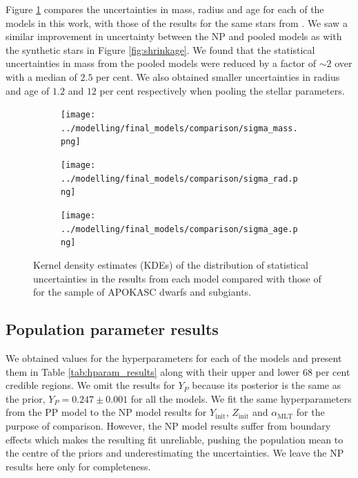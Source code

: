 \documentclass[a4paper,fleqn,usenatbib]{mnras}
\newcommand{\mlt}{\ensuremath{{\alpha_\mathrm{MLT}}}}
\begin{document}
Figure \ref{fig:unc-comp} compares the uncertainties in mass, radius and age for each of the models in this work, with those of the results for the same stars from . We saw a similar improvement in uncertainty between the NP and pooled models as with the synthetic stars in Figure \ref{fig:shrinkage}. We found that the statistical uncertainties in mass from the pooled models were reduced by a factor of $\sim 2$ over  with a median of $2.5$ per cent. We also obtained smaller uncertainties in radius and age of $1.2$ and $12$ per cent respectively when pooling the stellar parameters.

\begin{figure}
    \centering
    \begin{subfigure}[b]{.33\linewidth}
        \centering
        \texttt{[image: ../modelling/final\_models/comparison/sigma\_mass.png]}
    \end{subfigure}%
    \begin{subfigure}[b]{.33\linewidth}
        \centering
        \texttt{[image: ../modelling/final\_models/comparison/sigma\_rad.png]}
    \end{subfigure}%
    \begin{subfigure}[b]{.33\linewidth}
        \centering
        \texttt{[image: ../modelling/final\_models/comparison/sigma\_age.png]}
    \end{subfigure}%
    \caption{Kernel density estimates (KDEs) of the distribution of statistical uncertainties in the results from each model compared with those of  for the sample of APOKASC dwarfs and subgiants.}
    \label{fig:unc-comp}
\end{figure}

\subsection{Population parameter results}\label{sec:hparam-results}

We obtained values for the hyperparameters for each of the models and present them in Table \ref{tab:hparam_results} along with their upper and lower 68 per cent credible regions. We omit the results for $Y_P$ because its posterior is the same as the prior, $Y_P=0.247\pm0.001$ for all the models. We fit the same hyperparameters from the PP model to the NP model results for $Y_\mathrm{init}$, $Z_\mathrm{init}$ and $\mlt$ for the purpose of comparison. However, the NP model results suffer from boundary effects which makes the resulting fit unreliable, pushing the population mean to the centre of the priors and underestimating the uncertainties. We leave the NP results here only for completeness.
\end{document}
